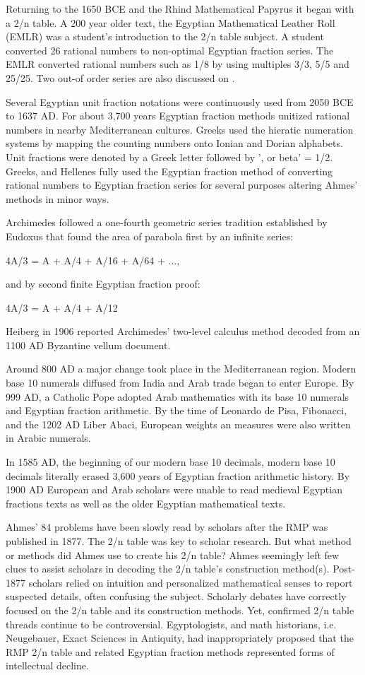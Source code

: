 \documentclass[12pt]{article}
\begin{document}
Returning to the 1650 BCE and the Rhind Mathematical Papyrus it began with a 2/n table. A 200 year older text, the Egyptian Mathematical Leather Roll (EMLR) was a student's introduction to the 2/n table subject. A student converted 26 rational numbers to non-optimal Egyptian fraction series. The EMLR converted rational numbers such as 1/8 by using multiples 3/3, 5/5 and 25/25. Two out-of order series are also discussed on .

Several Egyptian unit fraction notations were continuously used from 2050 BCE to 1637 AD. For about 3,700 years Egyptian fraction methods unitized rational numbers in nearby Mediterranean cultures. Greeks used the hieratic numeration systems by mapping the counting numbers onto Ionian and Dorian alphabets. Unit fractions were denoted by a Greek letter followed by ', or beta' = 1/2. Greeks, and Hellenes fully used the Egyptian fraction method of converting rational numbers to Egyptian fraction series for several purposes altering Ahmes' methods in minor ways. 

Archimedes followed a one-fourth geometric series tradition established by Eudoxus that found the area of parabola first by an infinite series:

4A/3 = A + A/4 + A/16 + A/64 + ...,

and by second finite Egyptian fraction proof:

4A/3 = A + A/4 + A/12

Heiberg in 1906 reported Archimedes' two-level calculus method decoded from an 1100 AD Byzantine vellum document.

Around 800 AD a major change took place in the Mediterranean region. Modern base 10 numerals diffused from India and Arab trade began to enter Europe. By 999 AD, a Catholic Pope adopted Arab mathematics with its base 10 numerals and Egyptian fraction arithmetic. By the time of Leonardo de Pisa, Fibonacci, and the 1202 AD Liber Abaci, European weights an measures were also written in Arabic numerals.

In 1585 AD, the beginning of our modern base 10 decimals, modern base 10 decimals literally erased 3,600 years of Egyptian fraction arithmetic history. By 1900 AD European and Arab scholars were unable to read medieval Egyptian fractions texts as well as the older Egyptian mathematical texts.  

Ahmes' 84 problems have been slowly read by scholars after the RMP was published in 1877. The 2/n table was key to scholar research. But what method or methods did Ahmes use to create his 2/n table? Ahmes seemingly left few clues to assist scholars in decoding the 2/n table's construction method(s). Post-1877 scholars relied on intuition and personalized mathematical senses to report suspected details, often confusing the subject. Scholarly debates have correctly focused on the 2/n table and its construction methods. Yet, confirmed 2/n table threads continue to be controversial. Egyptologists, and  math historians, i.e. Neugebauer, Exact Sciences in Antiquity, had inappropriately proposed that the RMP 2/n table and related Egyptian fraction methods represented forms of intellectual decline. 
\end{document}
